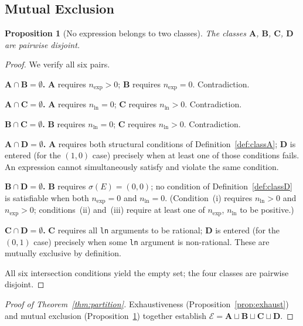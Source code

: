 \documentclass[12pt,a4paper]{article}
\newtheorem{proposition}[theorem]{Proposition}
\theoremstyle{definition}
\begin{document}
\subsection{Mutual Exclusion}

\begin{proposition}[No expression belongs to two classes]
\label{prop:exclusive}
The classes $\mathbf{A}$, $\mathbf{B}$, $\mathbf{C}$, $\mathbf{D}$
are pairwise disjoint.
\end{proposition}

\begin{proof}
We verify all six pairs.

\medskip
\noindent\textbf{$\mathbf{A} \cap \mathbf{B} = \emptyset$.}
$\mathbf{A}$ requires $n_{\exp} > 0$; $\mathbf{B}$ requires
$n_{\exp} = 0$.  Contradiction.

\medskip
\noindent\textbf{$\mathbf{A} \cap \mathbf{C} = \emptyset$.}
$\mathbf{A}$ requires $n_{\ln} = 0$; $\mathbf{C}$ requires
$n_{\ln} > 0$.  Contradiction.

\medskip
\noindent\textbf{$\mathbf{B} \cap \mathbf{C} = \emptyset$.}
$\mathbf{B}$ requires $n_{\ln} = 0$; $\mathbf{C}$ requires
$n_{\ln} > 0$.  Contradiction.

\medskip
\noindent\textbf{$\mathbf{A} \cap \mathbf{D} = \emptyset$.}
$\mathbf{A}$ requires both structural conditions of
Definition~\ref{def:classA}; $\mathbf{D}$ is entered (for the $(1,0)$
case) precisely when at least one of those conditions fails.
An expression cannot simultaneously satisfy and violate the same condition.

\medskip
\noindent\textbf{$\mathbf{B} \cap \mathbf{D} = \emptyset$.}
$\mathbf{B}$ requires $\sigma(E) = (0,0)$; no condition of
Definition~\ref{def:classD} is satisfiable when both
$n_{\exp} = 0$ and $n_{\ln} = 0$.
(Condition~(i) requires $n_{\ln} > 0$ and $n_{\exp} > 0$; conditions~(ii)
and~(iii) require at least one of $n_{\exp}$, $n_{\ln}$ to be positive.)

\medskip
\noindent\textbf{$\mathbf{C} \cap \mathbf{D} = \emptyset$.}
$\mathbf{C}$ requires all \texttt{ln} arguments to be rational;
$\mathbf{D}$ is entered (for the $(0,1)$ case) precisely when some
\texttt{ln} argument is non-rational.  These are mutually exclusive by
definition.

\medskip
\noindent All six intersection conditions yield the empty set; the four
classes are pairwise disjoint.
\end{proof}

\begin{proof}[Proof of Theorem~\ref{thm:partition}]
Exhaustiveness (Proposition~\ref{prop:exhaust}) and mutual exclusion
(Proposition~\ref{prop:exclusive}) together establish
$\mathcal{E} = \mathbf{A} \sqcup \mathbf{B} \sqcup \mathbf{C}
             \sqcup \mathbf{D}$.
\end{proof}
\end{document}
